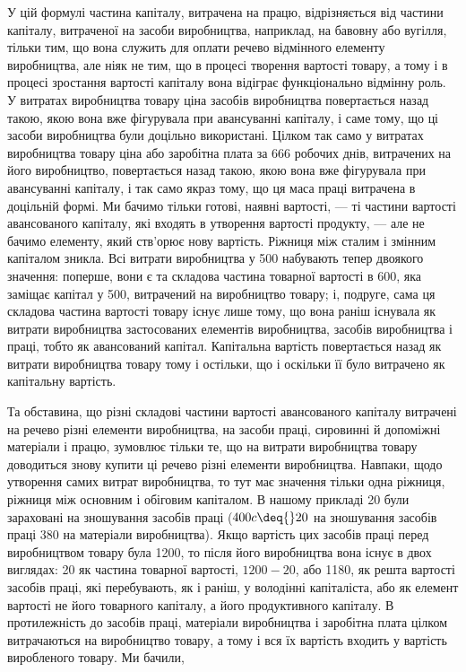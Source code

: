 
У цій формулі частина капіталу, витрачена на працю, відрізняється
від частини капіталу, витраченої на засоби виробництва,
наприклад, на бавовну або вугілля, тільки тим, що вона
служить для оплати речево відмінного елементу виробництва,
але ніяк не тим, що в процесі творення вартості товару, а тому
і в процесі зростання вартості капіталу вона відіграє функціонально
відмінну роль. У витратах виробництва товару ціна засобів
виробництва повертається назад такою, якою вона вже
фігурувала при авансуванні капіталу, і саме тому, що ці засоби
виробництва були доцільно використані. Цілком так само у витратах
виробництва товару ціна або заробітна плата за 666
робочих днів, витрачених на його виробництво, повертається
назад такою, якою вона вже фігурувала при авансуванні капіталу,
і так само якраз тому, що ця маса праці витрачена в доцільній
формі. Ми бачимо тільки готові, наявні вартості, — ті
частини вартості авансованого капіталу, які входять в утворення
вартості продукту, — але не бачимо елементу, який ств'орює
нову вартість. Ріжниця між сталим і змінним капіталом зникла.
Всі витрати виробництва у 500 набувають
тепер двоякого значення: поперше, вони є та складова частина
товарної вартості в 600, яка заміщає капітал
у 500, витрачений на виробництво товару;
і, подруге, сама ця складова частина вартості товару існує лише
тому, що вона раніш існувала як витрати виробництва застосованих
елементів виробництва, засобів виробництва і праці, тобто
як авансований капітал. Капітальна вартість повертається назад
як витрати виробництва товару тому і остільки, що і оскільки
її було витрачено як капітальну вартість.

Та обставина, що різні складові частини вартості авансованого
капіталу витрачені на речево різні елементи виробництва,
на засоби праці, сировинні й допоміжні матеріали і працю,
зумовлює тільки те, що на витрати виробництва товару доводиться
знову купити ці речево різні елементи виробництва.
Навпаки, щодо утворення самих витрат виробництва, то тут має
значення тільки одна ріжниця, ріжниця між основним і обіговим
капіталом. В нашому прикладі 20 були зараховані
на зношування засобів праці ($400 c \deq{} 20$
на зношування засобів праці \dplus{} 380 на
матеріали виробництва). Якщо вартість цих засобів праці перед
виробництвом товару була \deq{} 1200, то після
його виробництва вона існує в двох виглядах: 20
як частина товарної вартості, $1200-20$, або 1180,
як решта вартості засобів праці, які перебувають, як і раніш,
у володінні капіталіста, або як елемент вартості не його
товарного капіталу, а його продуктивного капіталу. В протилежність
до засобів праці, матеріали виробництва і заробітна плата
цілком витрачаються на виробництво товару, а тому і вся їх
вартість входить у вартість виробленого товару. Ми бачили,
\parbreak{}  %
